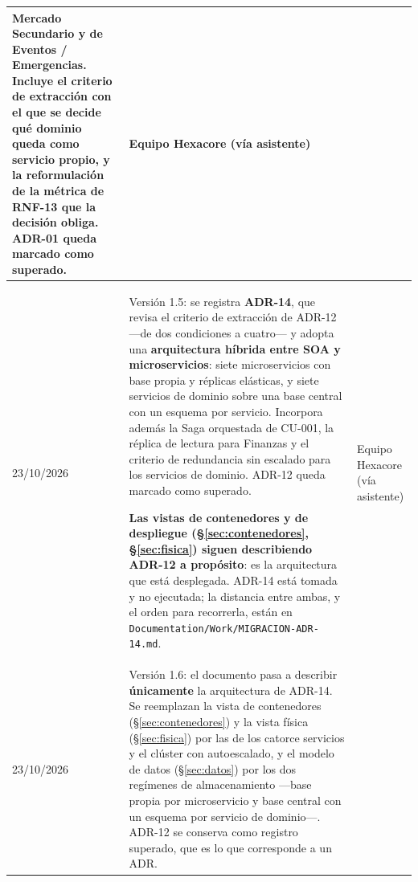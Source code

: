 \documentclass[11pt,a4paper]{article}
\begin{document}
\begin{center}
\begin{longtable}{|p{2.5cm}|p{7cm}|p{4cm}|}
Mercado Secundario y de Eventos / Emergencias. Incluye el criterio de extracción con el que se decide
qué dominio queda como servicio propio, y la reformulación de la métrica de RNF-13 que la decisión
obliga. ADR-01 queda marcado como superado. & Equipo Hexacore (vía asistente) \\
\hline
23/10/2026 & Versión 1.5: se registra \textbf{ADR-14}, que revisa el criterio de extracción de
ADR-12 ---de dos condiciones a cuatro--- y adopta una \textbf{arquitectura híbrida entre SOA y
microservicios}: siete microservicios con base propia y réplicas elásticas, y siete servicios de
dominio sobre una base central con un esquema por servicio. Incorpora además la Saga orquestada de
CU-001, la réplica de lectura para Finanzas y el criterio de redundancia sin escalado para los
servicios de dominio. ADR-12 queda marcado como superado.

\textbf{Las vistas de contenedores y de despliegue (§\ref{sec:contenedores}, §\ref{sec:fisica})
siguen describiendo ADR-12 a propósito}: es la arquitectura que está desplegada. ADR-14 está tomada y
no ejecutada; la distancia entre ambas, y el orden para recorrerla, están en
\texttt{Documentation/Work/MIGRACION-ADR-14.md}. & Equipo Hexacore (vía asistente) \\
\hline
23/10/2026 & Versión 1.6: el documento pasa a describir \textbf{únicamente} la arquitectura de
ADR-14. Se reemplazan la vista de contenedores (§\ref{sec:contenedores}) y la vista física
(§\ref{sec:fisica}) por las de los catorce servicios y el clúster con autoescalado, y el modelo de
datos (§\ref{sec:datos}) por los dos regímenes de almacenamiento ---base propia por microservicio y
base central con un esquema por servicio de dominio---. ADR-12 se conserva como registro superado,
que es lo que corresponde a un ADR.


\end{longtable}
\end{center}
\end{document}
